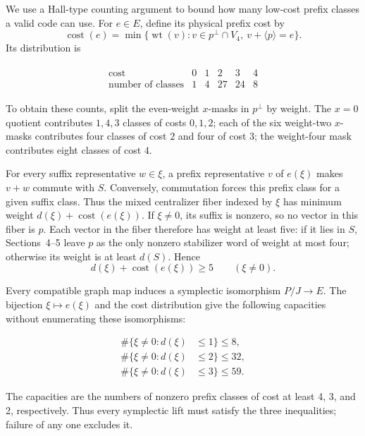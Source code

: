 \documentclass[11pt]{article}
\begin{document}
We use a Hall-type counting argument to bound how many low-cost prefix classes a valid code can use. For \(e\in E\), define its physical prefix cost by
\[
\operatorname{cost}(e)=
\min\{\operatorname{wt}(v):v\in p^\perp\cap V_{4},\ v+\langle p\rangle=e\}.
\]
Its distribution is

\[
\begin{aligned}
\begin{array}{c|ccccc}
\text{cost} & 0 & 1 & 2 & 3 & 4\\
\hline
\text{number of classes} & 1 & 4 & 27 & 24 & 8
\end{array}
\end{aligned}
\]

To obtain these counts, split the even-weight \(x\)-masks in \(p^\perp\) by weight. The \(x=0\) quotient contributes \(1,4,3\) classes of costs \(0,1,2\); each of the six weight-two \(x\)-masks contributes four classes of cost \(2\) and four of cost \(3\); the weight-four mask contributes eight classes of cost \(4\).

For every suffix representative \(w\in\xi\), a prefix representative \(v\) of \(e(\xi)\) makes \(v+w\) commute with \(S\). Conversely, commutation forces this prefix class for a given suffix class. Thus the mixed centralizer fiber indexed by \(\xi\) has minimum weight \(d(\xi)+\operatorname{cost}(e(\xi))\). If \(\xi\ne0\), its suffix is nonzero, so no vector in this fiber is \(p\). Each vector in the fiber therefore has weight at least five: if it lies in \(S\), Sections~4--5 leave \(p\) as the only nonzero stabilizer word of weight at most four; otherwise its weight is at least \(d(S)\). Hence
\[
d(\xi)+\operatorname{cost}(e(\xi))\ge5
\qquad(\xi\ne0).
\]

Every compatible graph map induces a symplectic isomorphism \(P/J\to E\). The bijection \(\xi\mapsto e(\xi)\) and the cost distribution give the following capacities without enumerating these isomorphisms:

\[
\begin{aligned}
\#\{\xi \ne  0 : d(\xi) &\le 1\}  \le  8, \\
\#\{\xi \ne  0 : d(\xi) &\le 2\}  \le  32, \\
\#\{\xi \ne  0 : d(\xi) &\le 3\}  \le  59.
\end{aligned}
\]

The capacities are the numbers of nonzero prefix classes of cost at least 4, 3, and 2, respectively. Thus every symplectic lift must satisfy the three inequalities; failure of any one excludes it.
\end{document}
